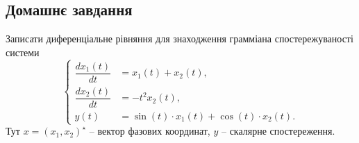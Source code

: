 
\subsection*{Домашнє завдання}

\begin{problem}
\end{problem}

\begin{solution}
\end{solution}

\begin{problem}
    Записати диференціальне рівняння для знаходження грамміана спостережуваності системи
    \begin{equation*}
        \left\{
            \begin{aligned}
                \dfrac{dx_1(t)}{dt} &= x_1(t) + x_2(t), \\
                \dfrac{dx_2(t)}{dt} &= - t^2x_2(t), \\
                y(t) &= \sin (t) \cdot x_1(t) + \cos (t) \cdot x_2(t).
            \end{aligned}   
        \right.
    \end{equation*}
    Тут $x = (x_1, x_2)^\star$ -- вектор фазових координат, $y$ -- скалярне спостереження.
\end{problem}

